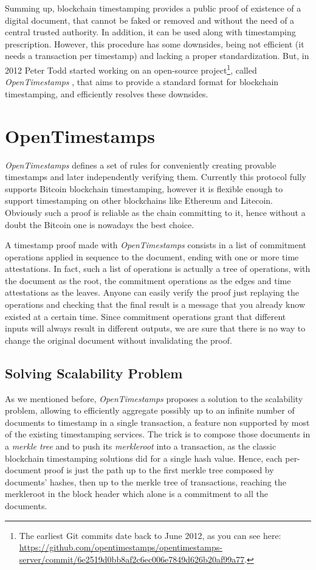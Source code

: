 \bigskip
\noindent
Summing up, blockchain timestamping provides a public proof of existence of a digital document, that cannot be faked or removed and without the need of a central trusted authority. In addition, it can be used along with timestamping prescription. However, this procedure has some downsides, being not efficient (it needs a transaction per timestamp) and lacking a proper standardization. But, in 2012 Peter Todd started working on an open-source project\footnote{The earliest Git commits date back to June 2012, as you can see here: \url{https://github.com/opentimestamps/opentimestamps-server/commit/6e2519d0bb8af2c6ec006e7849d626b20af99a77}.}, called \textit{OpenTimestamps} \cite{OTSWeb}, that aims to provide a standard format for blockchain timestamping, and efficiently resolves these downsides.

\bigskip
\section{OpenTimestamps}
\label{sec:ots}
\textit{OpenTimestamps} defines a set of rules for conveniently creating provable timestamps and later independently verifying them. Currently this protocol fully supports Bitcoin blockchain timestamping, however it is flexible enough to support timestamping on other blockchains like Ethereum and Litecoin. Obviously such a proof is reliable as the chain committing to it, hence without a doubt the Bitcoin one is nowadays the best choice.

\bigskip
\noindent
A timestamp proof made with \textit{OpenTimestamps} consists in a list of commitment operations applied in sequence to the document, ending with one or more time attestations. In fact, such a list of operations is actually a tree of operations, with the document as the root, the commitment operations as the edges and time attestations as the leaves. Anyone can easily verify the proof just replaying the operations and checking that the final result is a message that you already know existed at a certain time. Since commitment operations grant that different inputs will always result in different outputs, we are sure that there is no way to change the original document without invalidating the proof.

\bigskip
\subsection{Solving Scalability Problem}
As we mentioned before, \textit{OpenTimestamps} proposes a solution to the scalability problem, allowing to efficiently aggregate possibly up to an infinite number of documents to timestamp in a single transaction, a feature non supported by most of the existing timestamping services. The trick is to compose those documents in a \textit{merkle tree} and to push its \textit{merkleroot} into a transaction, as the classic blockchain timestamping solutions did for a single hash value. Hence, each per-document proof is just the path up to the first merkle tree composed by documents' hashes, then up to the merkle tree of transactions, reaching the merkleroot in the block header which alone is a commitment to all the documents.

